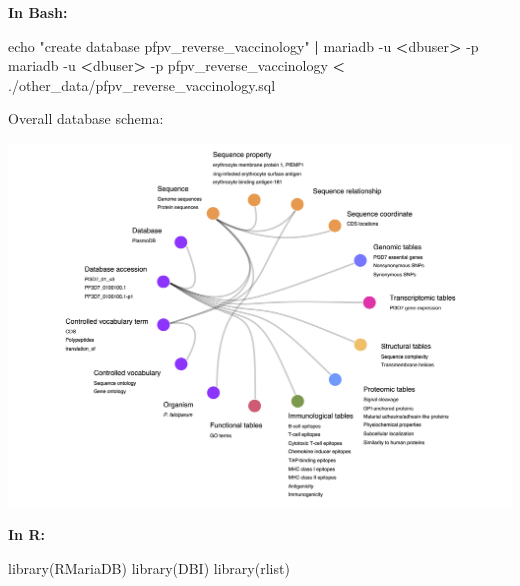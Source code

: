 \documentclass[
  11pt,
  oneside]{book}
\newenvironment{Shaded}{\begin{snugshade}}{\end{snugshade}}
\newcommand{\AttributeTok}[1]{\textcolor[rgb]{0.77,0.63,0.00}{#1}}
\newcommand{\BuiltInTok}[1]{#1}
\newcommand{\ExtensionTok}[1]{#1}
\newcommand{\FunctionTok}[1]{\textcolor[rgb]{0.00,0.00,0.00}{#1}}
\newcommand{\KeywordTok}[1]{\textcolor[rgb]{0.13,0.29,0.53}{\textbf{#1}}}
\newcommand{\NormalTok}[1]{#1}
\newcommand{\OperatorTok}[1]{\textcolor[rgb]{0.81,0.36,0.00}{\textbf{#1}}}
\newcommand{\StringTok}[1]{\textcolor[rgb]{0.31,0.60,0.02}{#1}}
\begin{document}
\textbf{In Bash: }

\begin{Shaded}
\begin{Highlighting}[]
\BuiltInTok{echo} \StringTok{"create database pfpv\_reverse\_vaccinology"} \KeywordTok{|} \ExtensionTok{mariadb} \AttributeTok{{-}u} \OperatorTok{\textless{}}\NormalTok{dbuser}\OperatorTok{\textgreater{}}\NormalTok{ {-}p}
\ExtensionTok{mariadb} \AttributeTok{{-}u} \OperatorTok{\textless{}}\NormalTok{dbuser}\OperatorTok{\textgreater{}}\NormalTok{ {-}p pfpv\_reverse\_vaccinology }\OperatorTok{\textless{}}\NormalTok{ ./other\_data/pfpv\_reverse\_vaccinology.sql}
\end{Highlighting}
\end{Shaded}

Overall database schema:

\begin{center}\includegraphics[width=1\linewidth]{./figures/database_schema} \end{center}

\textbf{In R: }

\begin{Shaded}
\begin{Highlighting}[]
\FunctionTok{library}\NormalTok{(RMariaDB)}
\FunctionTok{library}\NormalTok{(DBI)}
\FunctionTok{library}\NormalTok{(rlist)}
\end{Highlighting}
\end{Shaded}
\end{document}
